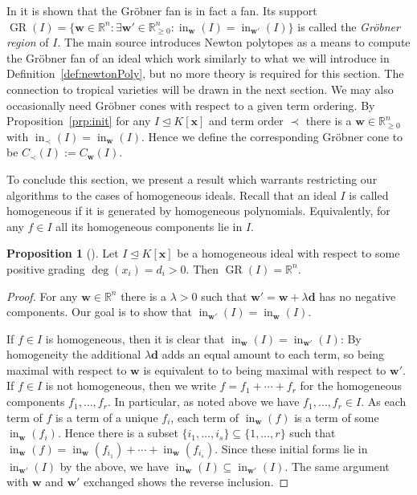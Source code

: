 \documentclass[
  paper=a4,
  titlepage,
  bibliography=totoc,
  listof=totoc,
  pagesize=pdftex
]{scrartcl}
\numberwithin{figure}{section}
\numberwithin{equation}{section}
\numberwithin{table}{section}
\newcommand*\setR{\mathds{R}}
\let\vec\mathbf
\let\idealof\trianglelefteq
\DeclareMathOperator{\initial}{in}
\DeclareMathOperator{\GR}{GR}
\theoremstyle{definition}
\newtheorem{proposition}[definition]{Proposition}
\numberwithin{definition}{section}
\begin{document}
In \cite[Theorem~2.19]{compGrobFan} it is shown that the Gröbner fan is in fact a fan.
Its support $\GR(I) = \{ \vec w \in \setR^n : \exists \vec w' \in
\setR^n_{\geq0}:\initial_{\vec w}(I) = \initial_{\vec w'}(I)\}$ is called the
\emph{Gröbner region} of $I$. The main source \cite{SturmGBCP} introduces Newton polytopes
as a means to compute the Gröbner fan of an ideal which work similarly to what we will
introduce in Definition~\ref{def:newtonPoly}, but no more theory is required for this
section. The connection to tropical varieties will be drawn in the next section. We may
also occasionally need Gröbner cones with respect to a given term ordering. By
Proposition~\ref{prp:init} for any $I \idealof K[\vec x]$ and term order $\prec$ there is
a $\vec w \in \setR^n_{\geq0}$ with $\initial_\prec(I) = \initial_{\vec w}(I)$. Hence we
define the corresponding Gröbner cone to be $C_\prec(I) := C_{\vec w}(I)$.

To conclude this section, we present a result which warrants restricting our algorithms to
the cases of homogeneous ideals. Recall that an ideal $I$ is called homogeneous if it is
generated by homogeneous polynomials. Equivalently, for any $f \in I$ all its homogeneous
components lie in $I$.

\begin{proposition}[{\cite[Proposition~1.12]{SturmGBCP}}]
  \label{prp:grRegion}
  Let $I \idealof K[\vec x]$ be a homogeneous ideal with respect to some positive grading
  $\deg(x_i) = d_i > 0$. Then $\GR(I) = \setR^n$.
  \begin{proof}
    For any $\vec w \in \setR^n$ there is a $\lambda > 0$ such that $\vec w' = \vec w +
    \lambda \vec d$ has no negative components. Our goal is to show that $\initial_{\vec
    w'}(I) = \initial_{\vec w}(I)$.

    If $f \in I$ is homogeneous, then it is clear that $\initial_{\vec w}(I) =
    \initial_{\vec w'}(I)$: By homogeneity the additional $\lambda \vec d$ adds an equal
    amount to each term, so being maximal with respect to $\vec w$ is equivalent to to
    being maximal with respect to $\vec w'$. If $f \in I$ is not homogeneous, then we
    write $f = f_1 + \cdots + f_r$ for the homogeneous components $f_1,\dots,f_r$. In
    particular, as noted above we have $f_1, \dots, f_r \in I$. As each term of $f$ is a
    term of a unique $f_i$, each term of $\initial_{\vec w}(f)$ is a term of some
    $\initial_{\vec w}(f_i)$. Hence there is a subset $\{i_1, \dots, i_s\} \subseteq \{1,
    \dots, r\}$ such that $\initial_{\vec w}(f) = \initial_{\vec w}(f_{i_1}) + \cdots +
    \initial_{\vec w}(f_{i_s})$. Since these initial forms lie in $\initial_{\vec w'}(I)$
    by the above, we have $\initial_{\vec w}(I) \subseteq \initial_{\vec w'}(I)$. The same
    argument with $\vec w$ and $\vec w'$ exchanged shows the reverse inclusion.
  \end{proof}
\end{proposition}
\end{document}
